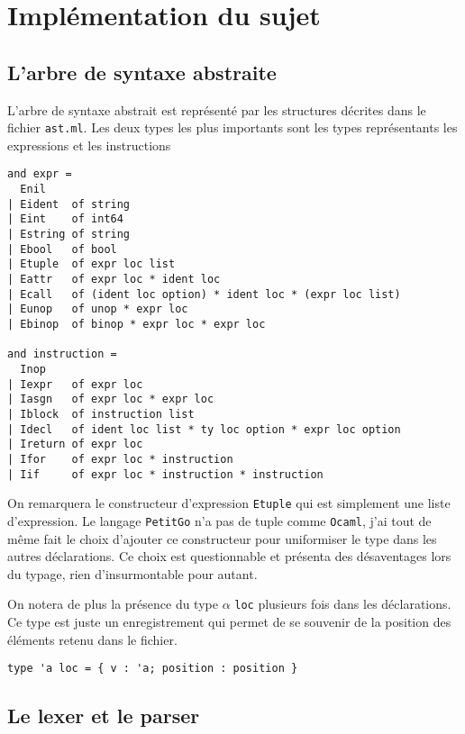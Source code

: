 \documentclass{article}
\begin{document}
\section{Implémentation du sujet}

\subsection{L'arbre de syntaxe abstraite\label{sec:ast}}

L'arbre de syntaxe abstrait est représenté par les structures décrites dans le fichier \texttt{ast.ml}. Les deux types les plus importants sont les types représentants les expressions et les instructions

\begin{verbatim}
and expr =
  Enil
| Eident  of string
| Eint    of int64
| Estring of string
| Ebool   of bool
| Etuple  of expr loc list
| Eattr   of expr loc * ident loc
| Ecall   of (ident loc option) * ident loc * (expr loc list)
| Eunop   of unop * expr loc
| Ebinop  of binop * expr loc * expr loc

and instruction =
  Inop
| Iexpr   of expr loc
| Iasgn   of expr loc * expr loc
| Iblock  of instruction list
| Idecl   of ident loc list * ty loc option * expr loc option
| Ireturn of expr loc
| Ifor    of expr loc * instruction
| Iif     of expr loc * instruction * instruction
\end{verbatim}

On remarquera le constructeur d'expression \texttt{Etuple} qui est simplement une liste d'expression. Le langage \texttt{PetitGo} n'a pas de tuple comme \texttt{Ocaml}, j'ai tout de même fait le choix d'ajouter ce constructeur pour uniformiser le type dans les autres déclarations. Ce choix est questionnable et présenta des désaventages lors du typage, rien d'insurmontable pour autant.

On notera de plus la présence du type $\alpha$ \texttt{loc} plusieurs fois dans les déclarations. Ce type est juste un enregistrement qui permet de se souvenir de la position des éléments retenu dans le fichier.

\begin{verbatim}
type 'a loc = { v : 'a; position : position }
\end{verbatim}

\subsection{Le lexer et le parser}
\end{document}

